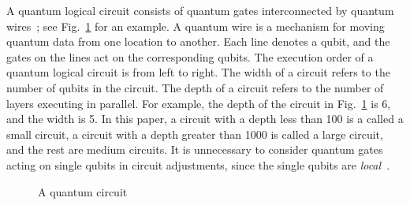 \documentclass[journal]{IEEEtran}
\newcommand{\leaveout}[1]{}
\begin{document}
A quantum logical circuit 
consists of quantum gates interconnected by quantum wires~\cite{Daei2020}; see Fig.~\ref{OriginalCircuit} for an example.
A quantum wire is a mechanism for moving quantum data from one location to another.
Each line denotes a qubit, and the gates on the lines act on the corresponding qubits.
The execution order of a quantum logical circuit  is from left to right.
The width %
of a circuit refers to the number of qubits in the circuit.
The depth %
of a circuit refers to the number of layers executing in parallel.
For example, the depth of the circuit in Fig.~\ref{OriginalCircuit} is 6, and the width is 5.
In this paper, a circuit with a depth less than 100 is a called a small circuit,
a circuit with a depth greater than 1000 is called a large circuit,
and the rest are medium circuits.
It is unnecessary to consider quantum gates acting on single qubits in circuit adjustments, since the single qubits are \textit{local}~\cite{Shafaei2013}.
\begin{figure}[htbp] 
	\begin{center}
		  {
	}					 
	\caption{A quantum circuit}
	\label{OriginalCircuit}	
	\end{center}
\end{figure}
\end{document}
